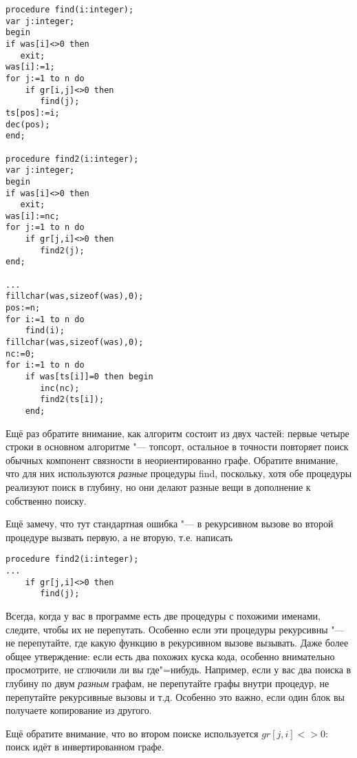 \begin{codesamplec}{3}\begin{verbatim}
procedure find(i:integer);
var j:integer;
begin
if was[i]<>0 then
   exit;
was[i]:=1;
for j:=1 to n do
    if gr[i,j]<>0 then
       find(j);
ts[pos]:=i;
dec(pos);
end;

procedure find2(i:integer);
var j:integer;
begin
if was[i]<>0 then
   exit;
was[i]:=nc;
for j:=1 to n do
    if gr[j,i]<>0 then
       find2(j);
end;

...
fillchar(was,sizeof(was),0);
pos:=n;
for i:=1 to n do
    find(i);
fillchar(was,sizeof(was),0);
nc:=0;
for i:=1 to n do
    if was[ts[i]]=0 then begin
       inc(nc);
       find2(ts[i]);
    end;
\end{verbatim}
\end{codesamplec}

Ещё раз обратите внимание, как алгоритм состоит из двух частей: первые четыре строки в основном алгоритме "--- топсорт,
остальное в точности повторяет поиск обычных компонент связности в неориентированно графе. Обратите внимание, что для
них используются \textit{разные} процедуры find, поскольку, хотя обе процедуры реализуют поиск в глубину,
но они делают разные вещи в дополнение к собственно поиску. 

Ещё замечу, что тут стандартная ошибка "--- в рекурсивном вызове во второй процедуре вызвать первую, а не вторую,
 т.е. написать
\begin{codesampleo}\begin{verbatim}
procedure find2(i:integer);
...
    if gr[j,i]<>0 then
       find(j);
\end{verbatim}
\end{codesampleo}
Всегда, когда у вас в программе есть две процедуры с похожими именами, следите, чтобы их не перепутать. Особенно если эти процедуры рекурсивны "--- не перепутайте, где какую функцию в рекурсивном вызове вызывать. Даже более общее утверждение: 
если есть два похожих куска кода, особенно внимательно просмотрите, не сглючили ли вы где"=нибудь. Например, если
у вас два поиска в глубину по двум \textit{разным} графам, не перепутайте графы внутри процедур, не перепутайте рекурсивные
вызовы и т.д. Особенно это важно, если один блок вы получаете копирование из другого.

Ещё обратите внимание, что во втором поиске используется $gr[j,i]<>0$: поиск идёт в инвертированном графе.

